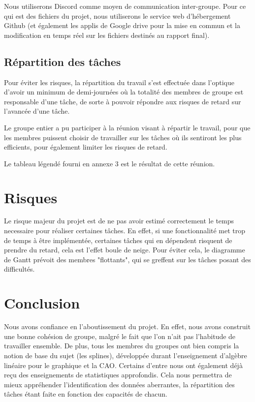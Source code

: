 \documentclass[a4paper,12pt]{article} %
\begin{document}
Nous utiliserons Discord comme moyen de communication inter-groupe. Pour ce qui est des fichiers du projet, nous utiliserons le service web d’hébergement Github (et également les applis de Google drive pour la mise en commun  et la modification en temps réel sur les fichiers destinés au rapport final).


\newpage
  \subsection{Répartition des tâches}

Pour éviter les risques, la répartition du travail s’est effectuée dans l’optique d’avoir un minimum de demi-journées où la totalité des membres de groupe est responsable d’une tâche, de sorte à pouvoir répondre aux risques de retard sur l’avancée d’une tâche.

Le groupe entier a pu participer à la réunion visant à répartir le travail, pour que les membres puissent choisir de travailler sur les tâches où ils sentiront les plus efficients, pour également limiter les risques de retard.

Le tableau légendé fourni en annexe 3 est le résultat de cette réunion.


\section{Risques}

Le risque majeur du projet est de ne pas avoir estimé correctement le temps necessaire pour réaliser certaines tâches. En effet, si une fonctionnalité met trop de temps à être implémentée, certaines tâches qui en dépendent risquent de prendre du retard, cela est l'effet boule de neige. Pour éviter cela, le diagramme de Gantt prévoit des membres "flottants", qui se greffent sur les tâches posant des difficultés.

\section*{Conclusion}

Nous avons confiance en l'aboutissement du projet. En effet, nous avons construit une bonne cohésion de groupe, malgré le fait que l'on n'ait pas l'habitude de travailler ensemble. De plus, tous les membres du groupes ont bien compris la notion de base du sujet (les splines), développée durant l'enseignement d'algèbre linéaire pour le graphique et la CAO. Certains d'entre nous ont également déjà reçu des enseignements de statistiques approfondis. Cela nous permettra de mieux appréhender l'identification des données aberrantes, la répartition des tâches étant faite en fonction des capacités de chacun. 
\end{document}
